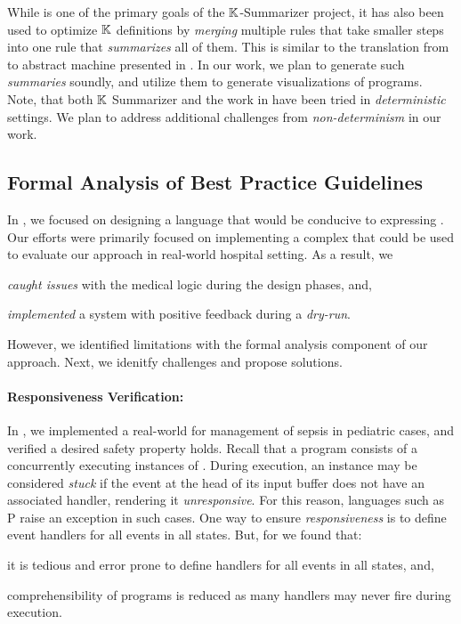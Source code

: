 While \SBC{} is one of the primary goals of the $\mathbb{K}{}$-Summarizer
project, it has also been used to optimize $\mathbb{K}$ definitions
by \emph{merging} multiple rules that take smaller steps into
one rule that \emph{summarizes} all of them. This is similar
to the translation from \SOS{} to abstract machine presented in
\cite{KoppelICFP22}. In our work, we plan to generate such
\emph{summaries} soundly, and utilize them to generate visualizations
of \MediK{} programs. Note, that both $\mathbb{K}$ Summarizer and the work
in \cite{KoppelICFP22} have been tried in \emph{deterministic} settings.
We plan to address additional challenges from \emph{non-determinism} in our
work.

\subsection{Formal Analysis of Best Practice Guidelines}\label{subsec:formal-analysis}

In \cite{SaxenaFMCAD23}, we focused on designing a language that would
be conducive to expressing \BPGs{}. Our efforts were primarily focused
on implementing a complex \CDSSs{} that could be used to evaluate
our approach in real-world hospital setting. As a result,
we
\begin{enumerate*}[label=(\alph*)]
  \item \emph{caught issues} with the medical logic during the design phases, and,
  \item \emph{implemented} a system with positive \HCP{} feedback during a
    \emph{dry-run}.
\end{enumerate*}
However, we identified limitations with the formal analysis component of our
approach. Next, we idenitfy challenges and propose solutions.

\paragraph{Responsiveness Verification:}

In \cite{SaxenaFMCAD23}, we implemented a real-world \CDSS{} for management of
sepsis in pediatric cases, and verified a desired safety property holds.
Recall that a \MediK{} program consists of a concurrently executing instances
of \FSMs{}. During execution, an instance may be considered \emph{stuck} if
the event at the head of its input buffer does not have an associated handler,
rendering it \emph{unresponsive}. For this reason, languages such as P
\cite{DesaiPLDI13} raise an exception in such cases. One way to ensure
\emph{responsiveness} is to define event handlers for all events
in all states. But, for \MediK{} we found that:
\begin{enumerate*}[label=(\alph*)]
  \item it is tedious and error prone to define handlers for all events in all
  states, and,
  \item comprehensibility of programs is reduced as many handlers may never fire
  during execution.
\end{enumerate*}

